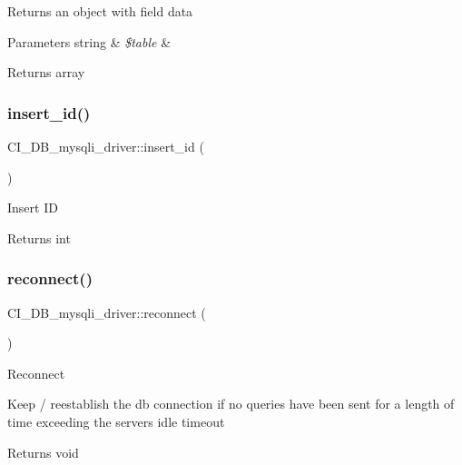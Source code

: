 Returns an object with field data


\begin{DoxyParams}[1]{Parameters}
string & {\em \$table} & \\
\hline
\end{DoxyParams}
\begin{DoxyReturn}{Returns}
array 
\end{DoxyReturn}
\mbox{\label{class_c_i___d_b__mysqli__driver_ad44d39922f18c93a8146cb32c9c0b293}} 
\subsubsection{\texorpdfstring{insert\+\_\+id()}{insert\_id()}}
{\footnotesize\ttfamily C\+I\+\_\+\+D\+B\+\_\+mysqli\+\_\+driver\+::insert\+\_\+id (\begin{DoxyParamCaption}{ }\end{DoxyParamCaption})}

Insert ID

\begin{DoxyReturn}{Returns}
int 
\end{DoxyReturn}
\mbox{\label{class_c_i___d_b__mysqli__driver_ad6af993a1669a890b9cdcaa32ba42acf}} 
\subsubsection{\texorpdfstring{reconnect()}{reconnect()}}
{\footnotesize\ttfamily C\+I\+\_\+\+D\+B\+\_\+mysqli\+\_\+driver\+::reconnect (\begin{DoxyParamCaption}{ }\end{DoxyParamCaption})}

Reconnect

Keep / reestablish the db connection if no queries have been sent for a length of time exceeding the server\textquotesingle{}s idle timeout

\begin{DoxyReturn}{Returns}
void 
\end{DoxyReturn}
\mbox{\label{class_c_i___d_b__mysqli__driver_aa15ddf57e8a05fe5fbdcdfe4a58d3170}} 
